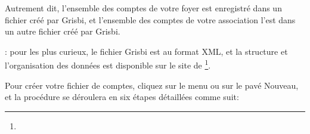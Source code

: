 Autrement dit, l’ensemble des comptes de votre foyer est enregistré dans un fichier créé par Grisbi,
et l’ensemble des comptes de votre association l’est dans un autre fichier créé par Grisbi.

\Note{}: pour les plus curieux, le fichier Grisbi est au format \gls{XML}, et la structure et l'organisation des données est disponible sur le site de \footnote{\urlSourceForgeDocumentationFormat{}}.



Pour créer votre fichier de comptes, cliquez sur le menu  ou sur le pavé Nouveau, et la procédure se déroulera en six étapes détaillées comme suit:

